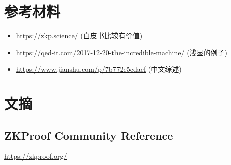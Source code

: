 \documentclass[11pt]{article}
\author{Johnny Zhang}
\date{\today}
\title{}
\begin{document}
\section{参考材料}
\label{sec:org8fcc899}
\begin{itemize}
\item \url{https://zkp.science/} (白皮书比较有价值)
\item \url{https://qed-it.com/2017-12-20-the-incredible-machine/} (浅显的例子)
\item \url{https://www.jianshu.com/p/7b772e5cdaef} (中文综述)
\end{itemize}

\section{文摘}
\label{sec:orge6cd05f}
\subsection{ZKProof Community Reference}
\label{sec:org6a40b4e}
\url{https://zkproof.org/}
\end{document}
